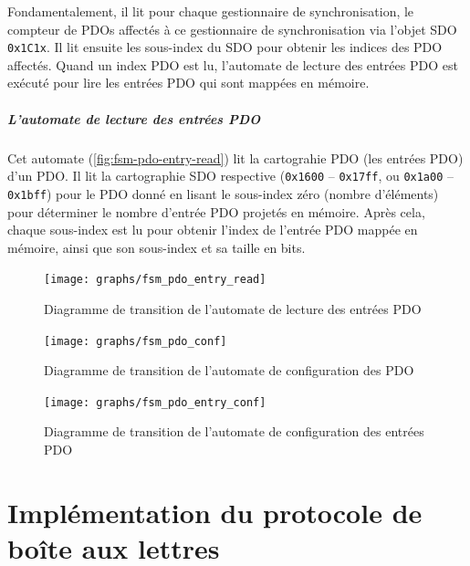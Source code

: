 \documentclass[a4paper,12pt,BCOR6mm,bibtotoc,idxtotoc]{scrbook}
\begin{document}
Fondamentalement, il lit pour chaque gestionnaire de synchronisation,
le compteur de PDOs affect\'es \`a ce gestionnaire de synchronisation
via l'objet SDO \lstinline+0x1C1x+.  Il lit ensuite les sous-index
du SDO pour obtenir les indices des PDO affect\'es.  Quand un index
PDO est lu, l'automate de lecture des entr\'ees PDO est ex\'ecut\'e
pour lire les entr\'ees PDO qui sont mapp\'ees en m\'emoire.


\paragraph{L'automate de lecture des entr\'ees PDO}
Cet automate (\autoref{fig:fsm-pdo-entry-read}) lit la cartograhie PDO
(les entr\'ees PDO) d'un PDO.  Il lit la cartographie SDO respective
(\lstinline+0x1600+ -- \lstinline+0x17ff+, ou \lstinline+0x1a00+ --
\lstinline+0x1bff+) pour le PDO donn\'e en lisant le sous-index z\'ero
(nombre d'\'el\'ements) pour d\'eterminer le nombre d'entr\'ee PDO
projet\'es en m\'emoire. Apr\`es cela, chaque sous-index est lu
pour obtenir l'index de l'entr\'ee PDO mapp\'ee en m\'emoire, ainsi
que son sous-index et sa taille en bits.

\begin{figure}[htbp]
  \centering
  \texttt{[image: graphs/fsm\_pdo\_entry\_read]}
  \caption{Diagramme de transition de l'automate de lecture des entr\'ees PDO}
  \label{fig:fsm-pdo-entry-read}
\end{figure}

\begin{figure}[htbp]
  \centering
  \texttt{[image: graphs/fsm\_pdo\_conf]}
  \caption{Diagramme de transition de l'automate de configuration des PDO}
  \label{fig:fsm-pdo-conf}
\end{figure}

\begin{figure}[htbp]
  \centering
  \texttt{[image: graphs/fsm\_pdo\_entry\_conf]}
  \caption{Diagramme de transition de l'automate de configuration
    des entr\'ees PDO}
  \label{fig:fsm-pdo-entry-conf}
\end{figure}


\chapter{Impl\'ementation du protocole de bo\^ite aux lettres}

\end{document}
